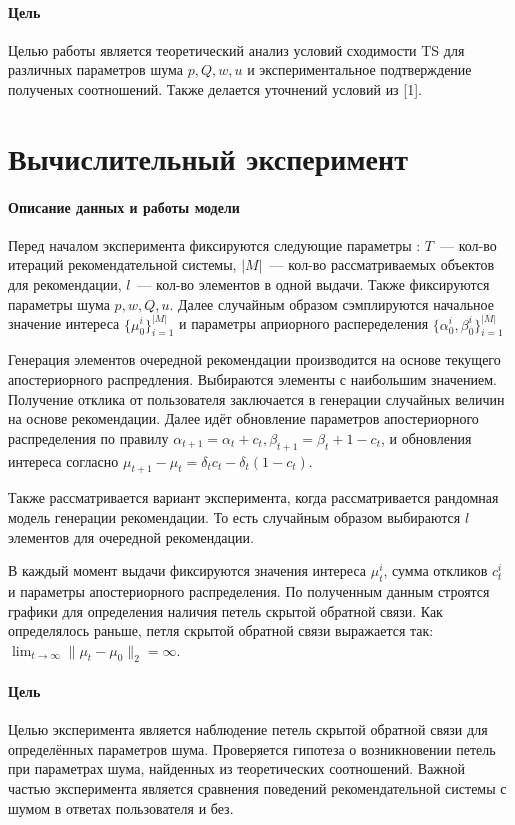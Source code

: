 \documentclass[12pt, twoside]{article}
\begin{document}
\paragraph{Цель}
Целью работы является теоретический анализ условий сходимости TS для различных параметров шума $p, Q, w, u$ и экспериментальное подтверждение полученых соотношений. 
Также делается уточнений условий из [1]. 

\section{Вычислительный эксперимент}
\paragraph{Описание данных и работы модели}
Перед началом эксперимента фиксируются следующие параметры : $T$~--- кол-во итераций рекомендательной системы, $|M|$~--- кол-во рассматриваемых объектов для рекомендации, $l$~--- кол-во элементов в одной выдачи. 
Также фиксируются параметры шума $p, w, Q, u$.
Далее случайным образом сэмплируются начальное значение интереса $\{\mu_0^i\}_{i=1}^{|M|}$ и параметры априорного распеределения $\{\alpha_0^i, \beta_0^i\}_{i=1}^{|M|}$  

Генерация элементов очередной рекомендации производится на основе текущего апостериорного распредления. 
Выбираются элементы с наибольшим значением. 
Получение отклика от пользователя заключается в генерации случайных величин на основе рекомендации.
Далее идёт обновление параметров апостериорного распределения по правилу $\alpha_{t+1} = \alpha_t + c_t, \beta_{t+1} = \beta_t + 1 - c_t$, и обновления интереса согласно 
$\mu_{t+1} - \mu_{t} = \delta_t c_t - \delta_t (1 - c_t)$.

Также рассматривается вариант эксперимента, когда рассматривается рандомная модель генерации рекомендации. То есть случайным образом выбираются $l$ элементов для очередной рекомендации. 

В каждый момент выдачи фиксируются значения интереса $\mu_t^i$, сумма откликов $c_t^i$ и параметры апостериорного распределения. 
По полученным данным строятся графики для определения наличия петель скрытой обратной связи.
Как определялось раньше, петля скрытой обратной связи выражается так: $\lim_{t \to \infty} \|\mu_t - \mu_0 \|_2 = \infty$.

\paragraph{Цель}
Целью эксперимента является наблюдение петель скрытой обратной связи для определённых параметров шума. 
Проверяется гипотеза о возникновении петель при параметрах шума, найденных из теоретических соотношений. 
Важной частью эксперимента является сравнения поведений рекомендательной системы с шумом в ответах пользователя и без. 
\end{document}
